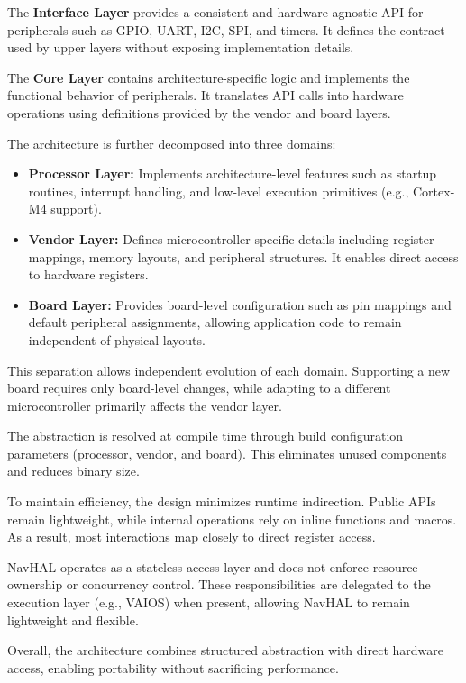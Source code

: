 The \textbf{Interface Layer} provides a consistent and hardware-agnostic API for peripherals such as GPIO, UART, I2C, SPI, and timers. It defines the contract used by upper layers without exposing implementation details.

The \textbf{Core Layer} contains architecture-specific logic and implements the functional behavior of peripherals. It translates API calls into hardware operations using definitions provided by the vendor and board layers.

The architecture is further decomposed into three domains:

\begin{itemize}
    \item \textbf{Processor Layer:}  
    Implements architecture-level features such as startup routines, interrupt handling, and low-level execution primitives (e.g., Cortex-M4 support).

    \item \textbf{Vendor Layer:}  
    Defines microcontroller-specific details including register mappings, memory layouts, and peripheral structures. It enables direct access to hardware registers.

    \item \textbf{Board Layer:}  
    Provides board-level configuration such as pin mappings and default peripheral assignments, allowing application code to remain independent of physical layouts.
\end{itemize}

This separation allows independent evolution of each domain. Supporting a new board requires only board-level changes, while adapting to a different microcontroller primarily affects the vendor layer.

The abstraction is resolved at compile time through build configuration parameters (processor, vendor, and board). This eliminates unused components and reduces binary size.

To maintain efficiency, the design minimizes runtime indirection. Public APIs remain lightweight, while internal operations rely on inline functions and macros. As a result, most interactions map closely to direct register access.

NavHAL operates as a stateless access layer and does not enforce resource ownership or concurrency control. These responsibilities are delegated to the execution layer (e.g., VAIOS) when present, allowing NavHAL to remain lightweight and flexible.

Overall, the architecture combines structured abstraction with direct hardware access, enabling portability without sacrificing performance.
